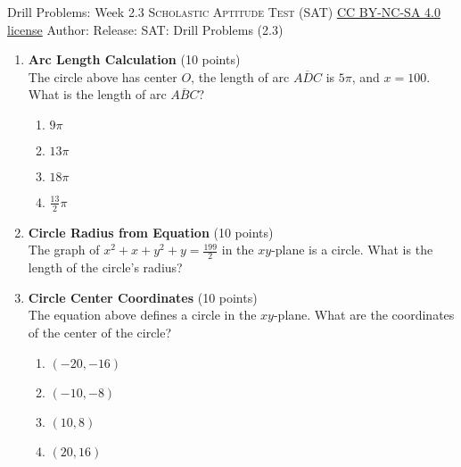 \newpage\handout
{Drill Problems: Week 2.3}
{\textsc{Scholastic Aptitude Test (SAT)}}
{\href{https://creativecommons.org/licenses/by-nc-sa/4.0/}{CC BY-NC-SA 4.0 license}}
{Author: \BookAuthor}{Release: \generatedOn}
{SAT: Drill Problems (2.3)}


\begin{enumerate}
  \item \textbf{Arc Length Calculation} (10 points)\\
  The circle above has center $O$, the length of arc $\overline{ADC}$ is $5\pi$, and $x=100$. What is the length of arc $\overline{ABC}$?
  \begin{enumerate}[label=(\Alph*)]
    \item $9\pi$
    \item $13\pi$
    \item $18\pi$
    \item $\frac{13}{2}\pi$
  \end{enumerate}
  \begin{subanswer}
  \end{subanswer}

  \item \textbf{Circle Radius from Equation} (10 points)\\
  The graph of $x^{2}+x+y^{2}+y=\frac{199}{2}$ in the $xy$-plane is a circle. What is the length of the circle's radius?
  \begin{subanswer}
  \end{subanswer}

  \item \textbf{Circle Center Coordinates} (10 points)\\
  The equation above defines a circle in the $xy$-plane. What are the coordinates of the center of the circle?
  \begin{enumerate}[label=(\Alph*)]
    \item $(-20,-16)$
    \item $(-10,-8)$
    \item $(10,8)$
    \item $(20,16)$
  \end{enumerate}
  \begin{subanswer}
  \end{subanswer}

  \newpage


\end{enumerate}
